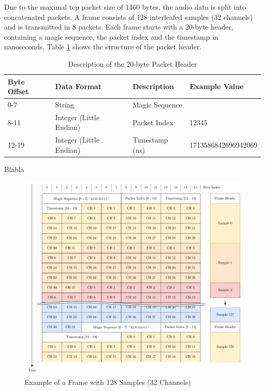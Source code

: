 \newpage
Due to the maximal \acrshort{tcp} packet size of 1460 bytes, the audio data is split into concatenated packets.
A frame consists of 128 interleafed samples (32 channels) and is transmitted in 8 packets.
Each frame starts with a 20-byte header, containing a magic sequence, the packet index and the timestamp in nanoseconds.
Table \ref{tab:packet_header} shows the structure of the packet header.
\begin{table}[h!]
	\centering
	\begin{tabular}{|l|l|l|l|}
		\hline
		\textbf{Byte Offset} & \textbf{Data Format}    & \textbf{Description} & \textbf{Example Value} \\ \hline
		0-7                  & String                  & Magic Sequence       & \codeword{HERON666}    \\ \hline
		8-11                 & Integer (Little Endian) & Packet Index         & 12345                  \\ \hline
		12-19                & Integer (Little Endian) & Timestamp (ns)       & 1713586842696942069    \\ \hline
	\end{tabular}
	\caption{Description of the 20-byte Packet Header}
	\label{tab:packet_header}
\end{table}

Blabla

\begin{figure}[h]
	\centering
	\includegraphics[width=1.0\textwidth]{images/6_design_final/Audio_Stream_Frame.pdf}
	\caption{Example of a Frame with 128 Samples (32 Channels)}
	\label{fig:frame_example}
\end{figure}

